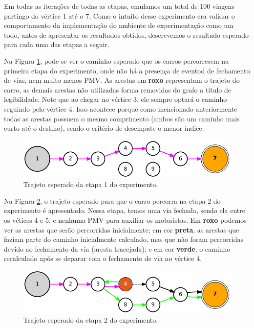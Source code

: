 Em todas as iterações de todas as etapas, emulamos um total de 100 viagens partingo do vértice 1 até o 7.
Como o intuito desse experimento era validar o comportamento da implementação do ambiente de experimentação como um todo, antes de apresentar os resultados obtidos, descrevemos o resultado esperado para
cada uma das etapas a seguir.

Na Figura \ref{fig:mapa_etapa1}, pode-se ver o caminho esperado que os carros percorresem na primeira etapa do experimento, onde não há a presença de eventod de fechamento de vias, nem muito menos PMV.
As arestas em \textbf{roxo} representam o trajeto do carro, as demais arestas não utilizadas forma removidas do grafo a título de legibilidade.
Note que ao chegar no vértice 3, ele sempre optará o caminho seguindo pelo vértice 4.
Isso acontece porque como mencionado anteriormente todas as arestas possuem o mesmo comprimento (ambos são um caminho mais curto até o destino), sendo o critério de desempate o menor índice.

\begin{figure}[ht]
	\centering
	\includegraphics[width=\textwidth]{figuras/mapa_etapa1.png}
	\caption{Trajeto esperado da etapa 1 do experimento.}
	\label{fig:mapa_etapa1}
\end{figure}

Na Figura \ref{fig:mapa_etapa2}, o trajeto esperado para que o carro percorra na etapa 2 do experimento é apresentado. Nessa etapa, temos uma via fechada, sendo ela entre os vétices 4 e 5, e nenhuma
PMV para auxiliar os motoristas.
Em \textbf{roxo} podemos ver as arestas que serão percorridas inicialmente;
em cor \textbf{preta}, as arestas que faziam parte do caminho inicialmente calculado, mas que não foram percorridas devido ao fechamento da via (aresta tracejada);
e em cor \textbf{verde}, o caminho recalculado após se deparar com o fechamento de via no vértice 4.

\begin{figure}[ht]
	\centering
	\includegraphics[width=\textwidth]{figuras/mapa_etapa2.png}
	\caption{Trajeto esperado da etapa 2 do experimento.}
	\label{fig:mapa_etapa2}
\end{figure}

